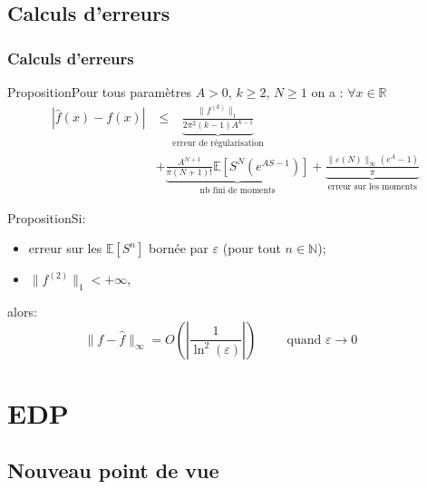 \documentclass{beamer}
\newcommand{\prop}[1]{\begin{block}{Proposition}#1\end{block}}
\newcommand{\pth}[1]{\left(#1\right)}
\newcommand{\cro}[1]{\left[#1\right]}
\newcommand{\abs}[1]{\left|#1\right|}
\newcommand{\dabs}[1]{\|#1\|}
\newcommand{\comment}[1]{\hspace{1cm}\text{#1}\hspace{1cm}}
\newcommand{\Er}{\mathbb{R}}
\newcommand{\En}{\mathbb{N}}
\newcommand{\Esp}[1]{\mathbb{E}\cro{#1}}
\begin{document}
\subsection{Calculs d'erreurs}

\begin{frame}[allowframebreaks]
  \frametitle{Calculs d'erreurs}
  \prop{Pour tous paramètres $A>0$, $k\geqslant 2$, $N\geqslant 1$ on a : $\forall x\in\Er$
    \begin{align*}
      \abs{\hat{f}(x)-f(x)}&\leqslant\underbrace{\frac{\dabs{f^{(k)}}_1}{2\pi^2(k-1)A^{k-1}}}_{\text{erreur de régularisation}}\\
      &+\underbrace{\frac{A^{N+1}}{\pi(N+1)!}\Esp{S^N(e^{AS-1})}}_{\text{nb fini de moments}}+\underbrace{\frac{\dabs{\varepsilon(N)}_{\infty}(e^A-1)}{\pi}}_{\text{erreur sur les moments}}
    \end{align*}
    
    }
  \prop{Si:
    \begin{itemize}[label=$\bullet$]
    \item erreur sur les $\Esp{S^n}$ bornée par $\varepsilon$ (pour tout $n\in\En$);
    \item$\dabs{f^{(2)}}_1<+\infty$,
    \end{itemize}
    alors:
    \[\dabs{f-\hat{f}}_{\infty}=O\pth{\abs{\frac{1}{\ln^2(\varepsilon)}}}\comment{quand $\varepsilon\to 0$}\]
    }

\end{frame}

\section{EDP}

\begin{frame}
  \sectionpage
\end{frame}

\subsection{Nouveau point de vue}
\end{document}
